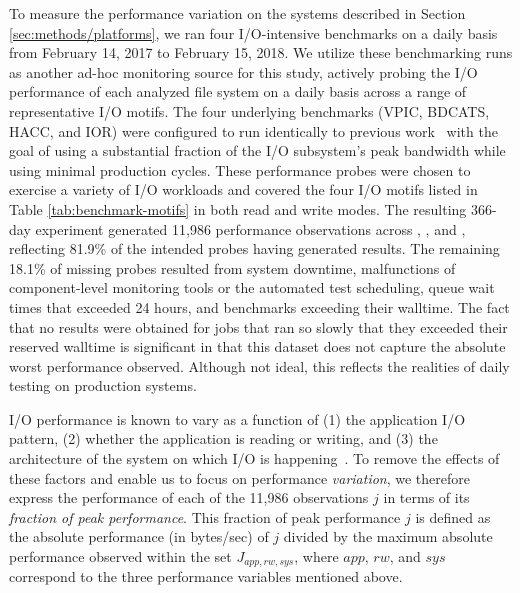 To measure the performance variation on the systems described in Section \ref{sec:methods/platforms}, we ran four I/O-intensive benchmarks on a daily basis from February 14, 2017 to February 15, 2018.
We utilize these benchmarking runs as another ad-hoc monitoring source for this study, actively probing the I/O performance of each analyzed file system on a daily basis across a range of representative I/O motifs.
The four underlying benchmarks (VPIC, BDCATS, HACC, and IOR) were configured to run identically to previous work~\cite{Lockwood2017} with the goal of using a substantial fraction of the I/O subsystem's peak bandwidth while using minimal production cycles.
These performance probes were chosen to exercise a variety of I/O workloads and covered the four I/O motifs listed in Table \ref{tab:benchmark-motifs} in both read and write modes.
The resulting 366-day experiment generated 11,986 performance observations across \mira, \cori, and \edison, reflecting 81.9\% of the intended probes having generated results.
The remaining 18.1\% of missing probes resulted from system downtime, malfunctions of component-level monitoring tools or the automated test scheduling, queue wait times that exceeded 24 hours, and benchmarks exceeding their walltime.
The fact that no results were obtained for jobs that ran so slowly that they exceeded their reserved walltime is significant in that this dataset does not capture the absolute worst performance observed.
Although not ideal, this reflects the realities of daily testing on production systems.


I/O performance is known to vary as a function of (1) the application I/O pattern, (2) whether the application is reading or writing, and (3) the architecture of the system on which I/O is happening~\cite{Lockwood2017}.
To remove the effects of these factors and enable us to focus on performance \emph{variation}, we therefore express the performance of each of the 11,986 observations $j$ in terms of its \emph{fraction of peak performance}.
This fraction of peak performance $j$ is defined as the absolute performance (in bytes/sec) of $j$ divided by the maximum absolute performance observed within the set $J_{app, rw, sys}$, where
%
%
$app$, $rw$, and $sys$ correspond to the three performance variables mentioned above.

